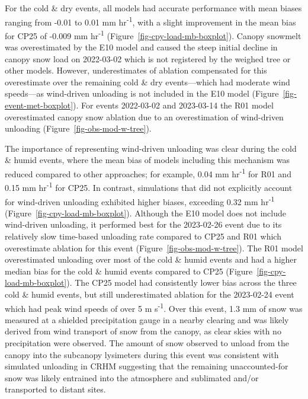 \documentclass[
]{agujournal2019}
\begin{document}
For the cold \& dry events, all models had accurate performance with
mean biases ranging from -0.01 to 0.01 mm hr\textsuperscript{-1}, with a
slight improvement in the mean bias for CP25 of -0.009 mm
hr\textsuperscript{-1} (Figure~\ref{fig-cpy-load-mb-boxplot}). Canopy
snowmelt was overestimated by the E10 model and caused the steep initial
decline in canopy snow load on 2022-03-02 which is not registered by the
weighed tree or other models. However, underestimates of ablation
compensated for this overestimate over the remaining cold \& dry
events---which had moderate wind speeds---as wind-driven unloading is
not included in the E10 model (Figure~\ref{fig-event-met-boxplot}). For
events 2022-03-02 and 2023-03-14 the R01 model overestimated canopy snow
ablation due to an overestimation of wind-driven unloading
(Figure~\ref{fig-obs-mod-w-tree}).

The importance of representing wind-driven unloading was clear during
the cold \& humid events, where the mean bias of models including this
mechanism was reduced compared to other approaches; for example, 0.04 mm
hr\textsuperscript{-1} for R01 and 0.15 mm hr\textsuperscript{-1} for
CP25. In contrast, simulations that did not explicitly account for
wind-driven unloading exhibited higher biases, exceeding 0.32 mm
hr\textsuperscript{-1} (Figure~\ref{fig-cpy-load-mb-boxplot}). Although
the E10 model does not include wind-driven unloading, it performed best
for the 2023-02-26 event due to its relatively slow time-based unloading
rate compared to CP25 and R01 which overestimate ablation for this event
(Figure~\ref{fig-obs-mod-w-tree}). The R01 model overestimated unloading
over most of the cold \& humid events and had a higher median bias for
the cold \& humid events compared to CP25
(Figure~\ref{fig-cpy-load-mb-boxplot}). The CP25 model had consistently
lower bias across the three cold \& humid events, but still
underestimated ablation for the 2023-02-24 event which had peak wind
speeds of over 5 m s\textsuperscript{-1}. Over this event, 1.3 mm of
snow was measured at a shielded precipitation gauge in a nearby clearing
and was likely derived from wind transport of snow from the canopy, as
clear skies with no precipitation were observed. The amount of snow
observed to unload from the canopy into the subcanopy lysimeters during
this event was consistent with simulated unloading in CRHM suggesting
that the remaining unaccounted-for snow was likely entrained into the
atmosphere and sublimated and/or transported to distant sites.
\end{document}
